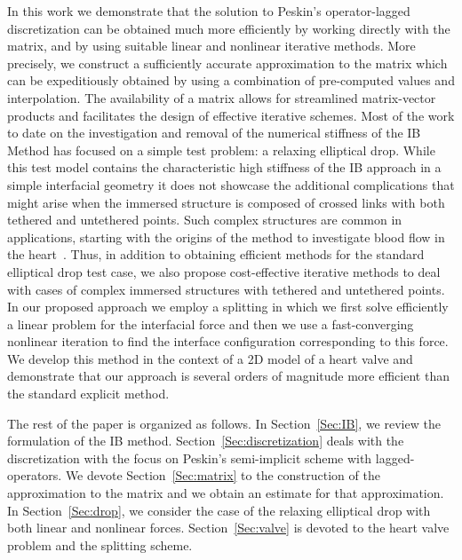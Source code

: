 \documentclass[preprint,12pt]{elsarticle}
\begin{document}
In this work  we demonstrate that the solution to Peskin's operator-lagged discretization
can be obtained much more efficiently by working directly with the matrix, and by using suitable linear and nonlinear iterative methods. More precisely, we construct a sufficiently accurate approximation to the matrix which can
be expeditiously obtained by using a combination of pre-computed values and interpolation.   The availability  of a matrix allows 
for streamlined matrix-vector products and facilitates the design of effective iterative schemes.   Most of the work to date on the investigation and removal of the numerical stiffness of the IB Method has focused on a simple test problem: a relaxing elliptical drop.
While this test model contains the characteristic high stiffness of the IB approach in a simple interfacial geometry it does not showcase the additional complications that might arise when the immersed structure is composed of crossed links with both tethered and untethered points. Such complex structures are common in applications, starting with the origins of the method to investigate blood
flow in the heart~\cite{Peskin77}.  Thus, in addition  to obtaining efficient methods for 
the standard elliptical drop test case, we also propose cost-effective iterative methods to deal with cases of complex immersed structures with tethered and untethered points. In our proposed approach
we employ  a splitting in which we first solve efficiently a linear problem for the interfacial force and then we use a fast-converging nonlinear iteration to find the interface configuration corresponding to this force.  We develop this method in the context of a 2D
model of a heart valve and demonstrate that our approach is several orders of magnitude more efficient than the standard explicit method. 
 
 The rest of the paper is organized as follows. In Section~\ref{Sec:IB}, we review the formulation of the IB method. Section~\ref{Sec:discretization} deals with the discretization with the focus on  Peskin's semi-implicit scheme with lagged-operators. We devote Section~\ref{Sec:matrix} to the construction of the approximation to the matrix and we obtain an estimate for that approximation.
 In Section~\ref{Sec:drop}, we consider the case of the relaxing elliptical drop with both linear and nonlinear forces.  Section~\ref{Sec:valve} is devoted to the heart valve problem and the splitting scheme.
\end{document}
